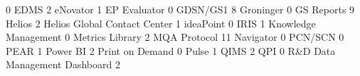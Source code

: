 \documentclass{article}
\begin{document}
\begin{Schunk}
\begin{Soutput}
                                                        0 
                                                     EDMS 
                                                        2 
                                                 eNovator 
                                                        1 
                                             EP Evaluator 
                                                        0 
                                                 GDSN/GS1 
                                                        8 
                                                Groninger 
                                                        0 
                                               GS Reports 
                                                        9 
                                                   Helios 
                                                        2 
                             Helios Global Contact Center 
                                                        1 
                                                ideaPoint 
                                                        0 
                                                     IRIS 
                                                        1 
                                     Knowledge Management 
                                                        0 
                                          Metrics Library 
                                                        2 
                                             MQA Protocol 
                                                       11 
                                                Navigator 
                                                        0 
                                                  PCN/SCN 
                                                        0 
                                                     PEAR 
                                                        1 
                                                 Power BI 
                                                        2 
                                          Print on Demand 
                                                        0 
                                                    Pulse 
                                                        1 
                                                     QIMS 
                                                        2 
                                                      QPI 
                                                        0 
                            R&D Data Management Dashboard 
                                                        2 

\end{Soutput}
\end{Schunk}
\end{document}
